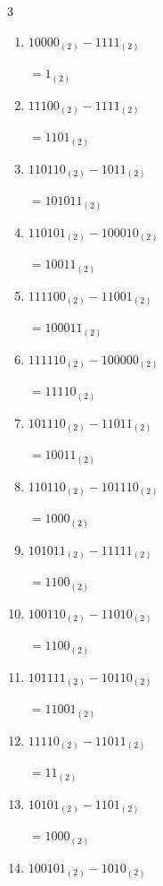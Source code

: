 \begin{multicols}{3}
\begin{enumerate}
        $=10101_{(2)}$

\columnbreak %

\resetques

  \item $10000_{(2)} - 1111_{(2)}$

        $=1_{(2)}$

  \item $11100_{(2)} - 1111_{(2)}$

        $=1101_{(2)}$

  \item $110110_{(2)} - 1011_{(2)}$

        $=101011_{(2)}$

  \item $110101_{(2)} - 100010_{(2)}$

        $=10011_{(2)}$

  \item $111100_{(2)} - 11001_{(2)}$

        $=100011_{(2)}$

  \item $111110_{(2)} - 100000_{(2)}$

        $=11110_{(2)}$

  \item $101110_{(2)} - 11011_{(2)}$

        $=10011_{(2)}$

  \item $110110_{(2)} - 101110_{(2)}$

        $=1000_{(2)}$

  \item $101011_{(2)} - 11111_{(2)}$

        $=1100_{(2)}$

  \item $100110_{(2)} - 11010_{(2)}$

        $=1100_{(2)}$

\columnbreak %

  \item $101111_{(2)} - 10110_{(2)}$

        $=11001_{(2)}$

  \item $11110_{(2)} - 11011_{(2)}$

        $=11_{(2)}$

  \item $10101_{(2)} - 1101_{(2)}$

        $=1000_{(2)}$

  \item $100101_{(2)} - 1010_{(2)}$


\end{enumerate}
\end{multicols}
